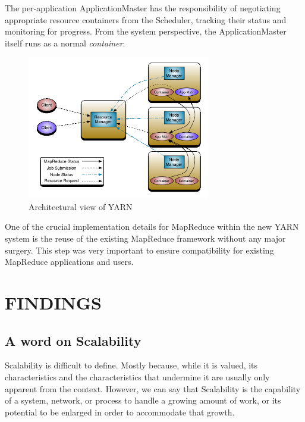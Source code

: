\documentclass[a4paper,12pt,oneside]{report}
\begin{document}
\begin{enumerate}
                The per-application ApplicationMaster has the responsibility of negotiating appropriate
                resource containers from the Scheduler, tracking their status and monitoring for progress. From
                the system perspective, the ApplicationMaster itself runs as a normal \textit{container}.

                \begin{figure}[h!]
                        \centering
                        \includegraphics[width=80mm]{yarn}
                        \caption{Architectural view of YARN}
                \end{figure}

                One of the crucial implementation details for MapReduce within the new YARN system is the
                reuse of the existing MapReduce framework without any major surgery. This step was very
                important to ensure compatibility for existing MapReduce applications and users. 

\end{enumerate}
\newpage
\section{FINDINGS}

\subsection{A word on Scalability}

Scalability is difficult to define. \cite{Hill1990} Mostly because, while it is valued, its characteristics and
the characteristics that undermine it are usually only apparent from the context. However,
we can say that Scalability is the capability of a system, network, or process to handle a
growing amount of work, or its potential to be enlarged in order to accommodate that
growth. \cite{Bondi2000}
\end{document}

